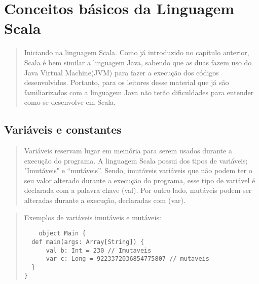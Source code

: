 

\chapter{ Conceitos b\'{a}sicos da Linguagem Scala}

\begin{quote}
  Iniciando na linguagem Scala. Como já introduzido no capítulo anterior, Scala é bem similar a linguagem Java, sabendo que as duas fazem uso do Java Virtual Machine(JVM) para fazer a execução dos códigos desenvolvidos. Portanto, para os leitores desse material que já são  familiarizados com a linguagem Java não terão dificuldades para entender como se desenvolve em Scala.
  \cite{Wampler2021}
\end{quote}
\section{Vari\'{a}veis e constantes}
\begin{quote}
  Variáveis reservam lugar em memória para serem usados durante a execução do programa. A linguagem Scala possui dos tipos de variáveis; "Imutáveis" e “mutáveis”.
  Sendo, imutáveis variáveis que não podem ter o seu valor alterado durante a execução do programa, esse tipo de variável é declarada com a palavra chave {\color{red}(val)}. Por outro lado, mutáveis podem ser alteradas durante a execução, declaradas com {\color{red}(var)}.
  \cite{Wampler2021}
\end{quote}
\begin{quote}
  \hspace{2.5mm} Exemplos de variáveis imutáveis e mutáveis:

  \begin{lstlisting}
    object Main {
  def main(args: Array[String]) {
      val b: Int = 230 // Imutaveis
      var c: Long = 9223372036854775807 // mutaveis
  }
}
    \end{lstlisting}

\end{quote}
